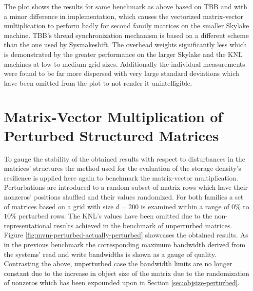      The plot shows the results for same benchmark as above based on TBB and with a minor difference in implementation,
     which causes the vectorized matrix-vector multiplication to perform badly for second family matrices on the smaller
     Skylake machine. TBB's thread synchronization mechanism is based on a different scheme than the one used by
     Sysmakeshift. The overhead weights significantly less which is demonstrated by the greater performance on the larger
     Skylake and the KNL machines at low to medium grid sizes. Additionally the individual measurements were found to be
     far more dispersed with very large standard deviations which have been omitted from the plot to not render it
     unintelligible.
 
  \section{Matrix-Vector Multiplication of Perturbed Structured Matrices} \label{sec:mvm-perturbed}

    To gauge the stability of the obtained results with respect to disturbances in the matrices' structures the method
    used for the evaluation of the storage density's resilience is applied here again to benchmark the matrix-vector
    multiplication. Perturbations are introduced to a random subset of matrix rows which have their nonzeros' positions
    shuffled and their values randomized. For both families a set of matrices based on a grid with size $d=200$ is
    examined within a range of $0\%$ to $10\%$ perturbed rows. The KNL's values have been omitted due to the
    non-representational results achieved in the benchmark of unperturbed matrices. Figure
    \ref{fig:mvm-perturbed-actually-perturbed} showcases the obtained results. As in the previous benchmark the
    corresponding maximum bandwidth derived from the systems' read and write bandwidths is shown as a gauge of quality.
    Contrasting the above, unperturbed case the bandwidth limits are no longer constant due to the increase in object
    size of the matrix due to the randomization of nonzeros which has been expounded upon in Section
    \ref{sec:objsize-perturbed}. 

